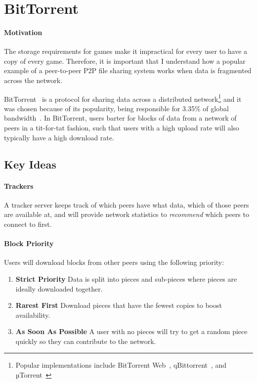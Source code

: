 
\section{BitTorrent}\label{sec:bittorrent}

\paragraph*{Motivation}
The storage requirements for games make it impractical for every user to have a copy of every game. Therefore, it is important that I understand how a popular example of a peer-to-peer P2P file sharing system works when data is fragmented across the network.

\newparagraph
BitTorrent~\cite{kaune_unraveling_2010, pouwelse_bittorrent_2005} is a protocol for sharing data across a distributed network\footnote{Popular implementations include BitTorrent Web~\cite{inc_bittorrent_nodate}, qBittorrent~\cite{noauthor_qbittorrent_nodate}, and µTorrent~\cite{inc_torrent_nodate}} and 
it was chosen because of its popularity, being responsible for 3.35\% of global bandwidth~\cite{noauthor_application_nodate}. 
In BitTorrent, users barter for blocks of data from a network of peers in a tit-for-tat fashion, such that users with a high upload rate will also typically have a high download rate.

\subsection*{Key Ideas}

\paragraph*{Trackers}
A tracker server keeps track of which peers have what data, which of those peers are available at, and will provide network statistics to \textit{recommend} which peers to connect to first.

\paragraph*{Block Priority}
Users will download blocks from other peers using the following priority:
\begin{enumerate}
  \item \textbf{Strict Priority} Data is split into pieces and sub-pieces where pieces are ideally downloaded together.
  \item \textbf{Rarest First} Download pieces that have the fewest copies to boost availability.
  \item \textbf{As Soon As Possible} A user with no pieces will try to get a random piece quickly so they can contribute to the network. 
\end{enumerate}

